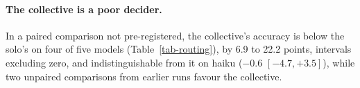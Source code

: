 \paragraph{The collective is a poor decider.}
In a paired comparison not pre-registered, the collective's accuracy is
below the solo's on four of five models (Table~\ref{tab-routing}), by
6.9 to 22.2 points, intervals excluding zero, and indistinguishable from it
on haiku ($-0.6$ $[-4.7, +3.5]$), while two unpaired comparisons from earlier
runs favour the collective.
